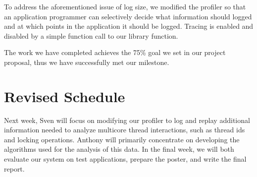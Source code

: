 \documentclass{article}
\begin{document}
To address the aforementioned issue of log size, we modified the
profiler so that an application programmer can selectively decide what
information should logged and at which points in the application
it should be logged.  Tracing is enabled
and disabled by a simple function call to our library function.

The work we have completed achieves the 75\% goal we set in our
project proposal, thus we have successfully met our milestone.

\section{Revised Schedule}
Next week, Sven will focus on modifying our profiler
to log and replay additional information needed to analyze multicore
thread interactions, such as thread ids and locking operations.
Anthony will primarily
concentrate on developing the algorithms used for the analysis of
this data.   In the final week, we will both evaluate our system
on test applications, prepare the poster, and write the final
report.



\end{document}
